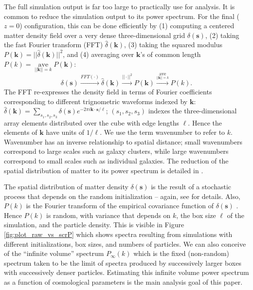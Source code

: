 \documentclass[11pt]{article}
\begin{document}
The full simulation output is far too large to practically use for analysis.  
It is common to reduce the simulation output to its power spectrum.  For the final ($z=0$) 
configuration, this can be done efficiently by (1) computing a centered matter density 
field over a very dense three-dimensional grid $\delta(\mathbf{s})$, 
(2) taking the fast Fourier transform (FFT) $\widehat{\delta}(\mathbf{k})$, 
(3) taking the squared modulus $P(\mathbf{k}) = || \widehat{\delta}(\mathbf{k}) ||^2$, 
and (4) averaging over $\mathbf{k}$'s of common length 
$P(k) = \operatorname{ave}\limits_{||\mathbf{k}|| = k}
  P(\mathbf{k})$:
\[
\delta(\mathbf{s}) 
\stackrel{FFT(\cdot)}{\longrightarrow}
\widehat{\delta}(\mathbf{k})
\stackrel{||\cdot||^2}{\longrightarrow}
P(\mathbf{k})
\stackrel{\operatorname{ave}\limits_{||\mathbf{k}|| = k}}{\longrightarrow}
P(k).
\]
The FFT re-expresses the density field in terms of Fourier coefficients corresponding 
to different trignometric waveforms indexed by $\mathbf{k}$:
$
\widehat{\delta}(\mathbf{k}) = 
\sum_{s_1,s_2,s_3} \delta(\mathbf{s}) 
e^{-2\pi i \mathbf{k} \cdot \mathbf{s}/\ell}
$; 
$(s_1,s_2,s_3)$ indexes the three-dimensional array elements distributed over the 
cube with edge lengths $\ell$.  Hence the elements of $\mathbf{k}$ have units of 
$1/\ell$. We use the term wavenumber to refer to $k$. Wavenumber has an inverse 
relationship to spatial distance; small wavenumbers correspond to large scales 
such as galaxy clusters, while large wavenumbers correspond to small scales such 
as individual galaxies. The reduction of the spatial distribution of matter to its 
power spectrum is detailed in \citet{heitmann2010coyote}. 


The spatial distribution of matter density  $\delta(\mathbf{s})$ is the result of 
a stochastic process that depends on the random initialization -- again, see 
\citet{heitmann2010coyote} for details. Also, $P(k)$ is the Fourier transform of 
the empirical covariance function of $\delta(\mathbf{s})$ \citep{schabenberger2017statistical}. 
Hence $P(k)$ is random, with variance that depends on $k$, the box size $\ell$ of the 
simulation, and the particle density.  This is visible in Figure \ref{fig:plot_raw_vs_scrP} 
which shows spectra resulting from simulations with different initializations, box sizes, 
and numbers of particles. We can also conceive of the ``infinite volume'' spectrum 
$P_\infty(k)$ which is the fixed (non-random) spectrum taken to be the limit of 
spectra produced by successively larger boxes with successively denser particles.
Estimating this infinite volume power spectrum as a function of cosmological parameters 
is the main analysis goal of this paper.
\end{document}
